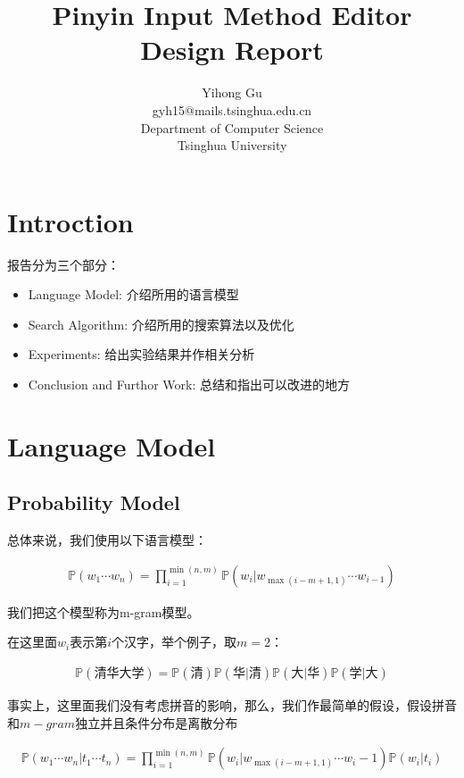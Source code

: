 \documentclass{article}
\title{Pinyin Input Method Editor\\Design Report}
\author{\large Yihong Gu\\gyh15@mails.tsinghua.edu.cn\\Department of Computer Science\\Tsinghua University}
\date{}
\begin{document}
\maketitle

\section{Introction}

报告分为三个部分：

\begin{itemize}
	\item Language Model: 介绍所用的语言模型
	\item Search Algorithm: 介绍所用的搜索算法以及优化
	\item Experiments: 给出实验结果并作相关分析
	\item Conclusion and Furthor Work: 总结和指出可以改进的地方
\end{itemize}

\section{Language Model}

\subsection{Probability Model}

总体来说，我们使用以下语言模型：

\begin{eqnarray}
	\mathbb{P}(w_1\cdots w_n) = \prod_{i=1}^{\min(n,m)}{\mathbb{P}(w_i\lvert w_{\max(i-m+1,1)} \cdots w_{i-1})}
\end{eqnarray}

我们把这个模型称为m-gram模型。

在这里面$w_i$表示第$i$个汉字，举个例子，取$m=2$：

\begin{eqnarray}
	\mathbb{P}(\text{清华大学})=\mathbb{P}(\text{清})\mathbb{P}(\text{华}\lvert\text{清})\mathbb{P}(\text{大}\lvert\text{华})\mathbb{P}(\text{学}\lvert\text{大})
\end{eqnarray}

事实上，这里面我们没有考虑拼音的影响，那么，我们作最简单的假设，假设拼音和$m-gram$独立并且条件分布是离散分布

\begin{eqnarray}
	\mathbb{P}(w_1\cdots w_n\lvert t_1 \cdots t_n) = \prod_{i=1}^{\min(n,m)}{\mathbb{P}(w_i\lvert w_{\max(i-m+1,1)} \cdots w_i-1)\mathbb{P}(w_i \lvert t_i)}
\end{eqnarray}
\end{document}
